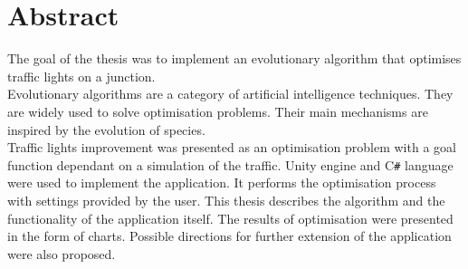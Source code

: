\chapter*{Abstract}
The goal of the thesis was to implement an evolutionary algorithm that optimises traffic lights on a junction. \\
Evolutionary algorithms are a category of artificial intelligence techniques. They are widely used to solve optimisation problems. Their main mechanisms are inspired by the evolution of species. \\
Traffic lights improvement was presented as an optimisation problem with a goal function dependant on a simulation of the traffic. Unity engine and C\texttt{\#} language were used to implement the application. It performs the optimisation process with settings provided by the user. This thesis describes the algorithm and the functionality of the application itself. The results of optimisation were presented in the form of charts. Possible directions for further extension of the application were also proposed.